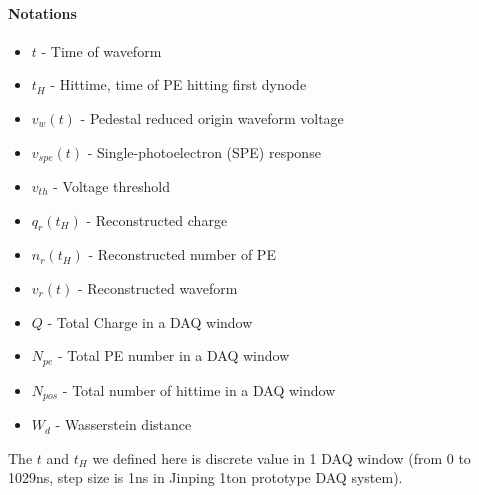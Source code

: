 \paragraph{Notations}
\begin{itemize}
    \item $t$ - Time of waveform
    \item $t_{H}$ - Hittime, time of PE hitting first dynode
    \item $v_{w}(t)$ - Pedestal reduced origin waveform voltage
    \item $v_{spe}(t)$ - Single-photoelectron (SPE) response
    \item $v_{th}$ - Voltage threshold
    \item $q_{r}(t_{H})$ - Reconstructed charge
    \item $n_{r}(t_{H})$ - Reconstructed number of PE
    \item $v_{r}(t)$ - Reconstructed waveform
    \item $Q$ - Total Charge in a DAQ window
    \item $N_{pe}$ - Total PE number in a DAQ window
    \item $N_{pos}$ - Total number of hittime in a DAQ window
    \item $W_{d}$ - Wasserstein distance
\end{itemize}
The $t$ and $t_{H}$ we defined here is discrete value in 1 DAQ window (from 0 to 1029ns, step size is 1ns in Jinping 1ton prototype DAQ system). 
